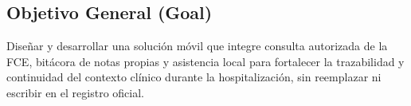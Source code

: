 \subsection{Objetivo General (Goal)}

Diseñar y desarrollar una solución móvil que integre consulta autorizada de la FCE, bitácora de notas propias y asistencia local para fortalecer la trazabilidad y continuidad del contexto clínico durante la hospitalización, sin reemplazar ni escribir en el registro oficial.
